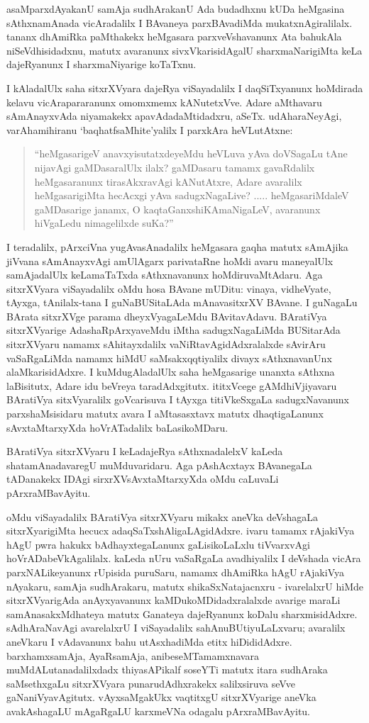 asaMparxdAyakanU samAja sudhArakanU Ada budadhxnu kUDa heMgasina sAthxnamAnada vicAradalilx I BAvaneya parxBAvadiMda mukatxnAgiralilalx. tananx dhAmiRka paMthakekx heMgasara parxveVshavanunx Ata bahukAla niSeVdhisidadxnu, matutx avaranunx sivxVkarisidAgalU sharxmaNarigiMta keLa dajeRyanunx I sharxmaNiyarige koTaTxnu.

I kAladalUlx saha sitxrXVyara dajeRya viSayadalilx I daqSiTxyanunx hoMdirada kelavu vicArapararanunx omomxmemx kANutetxVve. Adare aMthavaru sAmAnayxvAda niyamakekx apavAdadaMtidadxru, aSeTx. udAharaNeyAgi, varAhamihiranu  `baqhatfsaMhite'yalilx I parxkAra heVLutAtxne:
\begin{quote}
``heMgasarigeV anavxyisutatxdeyeMdu heVLuva yAva doVSagaLu tAne nijavAgi gaMDasaralUlx ilalx? gaMDasaru tamamx gavaRdalilx heMgasaranunx tirasAkxravAgi kANutAtxre, Adare avaralilx heMgasarigiMta hecAcxgi yAva sadugxNagaLive? ..... heMgasariMdaleV gaMDasarige janamx, O kaqtaGanxshiKAmaNigaLeV, avaranunx hiVgaLedu nimagelilxde suKa?''
\end{quote}

I teradalilx, pArxciVna yugAvasAnadalilx heMgasara gaqha matutx sAmAjika jiVvana sAmAnayxvAgi amUlAgarx parivataRne hoMdi avaru maneyalUlx samAjadalUlx keLamaTaTxda sAthxnavanunx hoMdiruvaMtAdaru. Aga sitxrXVyara viSayadalilx oMdu hosa BAvane mUDitu: vinaya, vidheVyate, tAyxga, tAnilalx-tana I guNaBUSitaLAda mAnavasitxrXV BAvane. I guNagaLu BArata sitxrXVge parama dheyxVyagaLeMdu BAvitavAdavu. BAratiVya sitxrXVyarige AdashaRpArxyaveMdu iMtha sadugxNagaLiMda BUSitarAda sitxrXVyaru namamx sAhitayxdalilx vaNiRtavAgidAdxralalxde sAvirAru vaSaRgaLiMda namamx hiMdU saMsakxqqtiyalilx divayx sAthxnavanUnx alaMkarisidAdxre. I kuMdugAladalUlx saha heMgasarige unanxta sAthxna laBisitutx, Adare idu beVreya taradAdxgitutx. ititxVcege gAMdhiVjiyavaru BAratiVya sitxVyaralilx goVcarisuva I tAyxga titiVkeSxgaLa sadugxNavanunx parxshaMsisidaru matutx avara I aMtasasxtavx matutx dhaqtigaLanunx sAvxtaMtarxyXda hoVrATadalilx baLasikoMDaru.

BAratiVya sitxrXVyaru I keLadajeRya sAthxnadalelxV kaLeda shatamAnadavaregU muMduvaridaru. Aga pAshAcxtayx BAvanegaLa tADanakekx IDAgi sirxrXVsAvxtaMtarxyXda oMdu caLuvaLi pArxraMBavAyitu.

oMdu viSayadalilx BAratiVya sitxrXVyaru mikakx aneVka deVshagaLa sitxrXyarigiMta hecucx adaqSaTxshAligaLAgidAdxre. ivaru tamamx rAjakiVya hAgU pwra hakukx bAdhayxtegaLanunx gaLisikoLaLxlu tiVvarxvAgi hoVrADabeVkAgalilalx. kaLeda nUru vaSaRgaLa avadhiyalilx I deVshada vicAra parxNALikeyanunx rUpisida puruSaru, namamx dhAmiRka hAgU rAjakiVya nAyakaru, samAja sudhArakaru, matutx shikaSxNatajacnxru - ivarelalxrU hiMde sitxrXVyarigAda anAyxyavanunx kaMDukoMDidadxralalxde avarige maraLi samAnasakxMdhateya matutx Ganateya dajeRyanunx koDalu sharxmisidAdxre. sAdhAraNavAgi avarelalxrU I viSayadalilx sahAnuBUtiyuLaLxvaru; avaralilx aneVkaru I vAdavanunx bahu utAsxhadiMda etitx hiDididAdxre. barxhamxsamAja, AyaRsamAja, anibeseMTamamxnavara muMdALutanadalilxdadx thiyasAPikalf soseYTi matutx itara sudhAraka saMsethxgaLu sitxrXVyara punarudAdhxrakekx salilxsiruva seVve gaNaniVyavAgitutx. vAyxsaMgakUkx vaqtitxgU sitxrXVyarige aneVka avakAshagaLU mAgaRgaLU karxmeVNa odagalu pArxraMBavAyitu.

